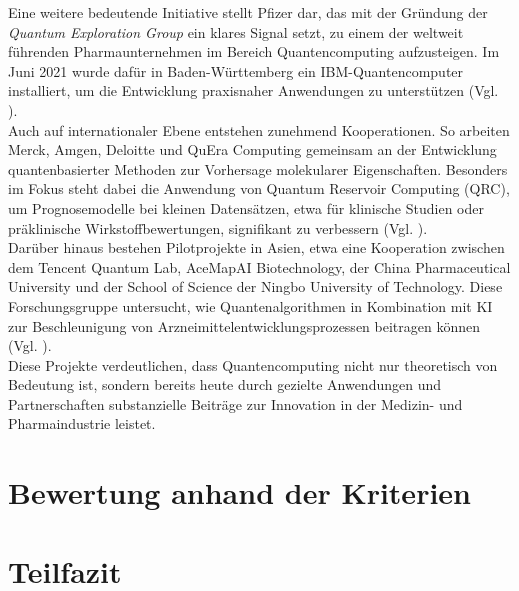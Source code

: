 Eine weitere bedeutende Initiative stellt Pfizer dar, das mit der Gründung der \textit{Quantum Exploration Group} ein klares Signal setzt, zu einem der weltweit führenden Pharmaunternehmen im Bereich Quantencomputing aufzusteigen. Im Juni 2021 wurde dafür in Baden-Württemberg ein IBM-Quantencomputer installiert, um die Entwicklung praxisnaher Anwendungen zu unterstützen (Vgl. \cite{papalitsas_quantum_2025}).\\

Auch auf internationaler Ebene entstehen zunehmend Kooperationen. So arbeiten Merck, Amgen, Deloitte und QuEra Computing gemeinsam an der Entwicklung quantenbasierter Methoden zur Vorhersage molekularer Eigenschaften. Besonders im Fokus steht dabei die Anwendung von Quantum Reservoir Computing (QRC), um Prognosemodelle bei kleinen Datensätzen, etwa für klinische Studien oder präklinische Wirkstoffbewertungen, signifikant zu verbessern (Vgl. \cite{beaulieu_robust_2024, kornjaca_large-scale_2024}).\\

Darüber hinaus bestehen Pilotprojekte in Asien, etwa eine Kooperation zwischen dem Tencent Quantum Lab, AceMapAI Biotechnology, der China Pharmaceutical University und der School of Science der Ningbo University of Technology. Diese Forschungsgruppe untersucht, wie Quantenalgorithmen in Kombination mit KI zur Beschleunigung von Arzneimittelentwicklungsprozessen beitragen können (Vgl. \cite{li_hybrid_2024}).\\

Diese Projekte verdeutlichen, dass Quantencomputing nicht nur theoretisch von Bedeutung ist, sondern bereits heute durch gezielte Anwendungen und Partnerschaften substanzielle Beiträge zur Innovation in der Medizin- und Pharmaindustrie leistet.



\section{Bewertung anhand der Kriterien}


\section{Teilfazit}


\printbibliography

